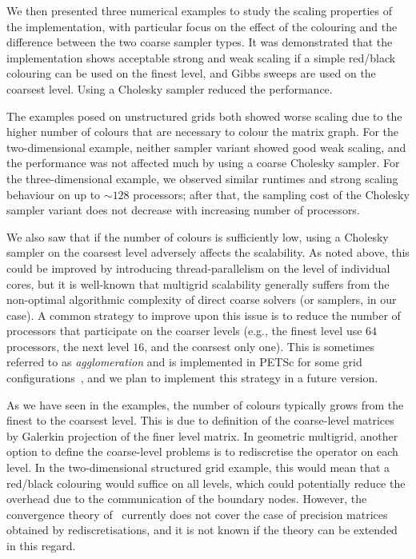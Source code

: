 \documentclass[
fontsize=11pt,
paper=a4,
numbers=noenddot
]{scrartcl}
\begin{document}
We then presented three numerical examples to study the scaling properties of the implementation, with particular focus on the effect of the colouring and the difference between the two coarse sampler types. It was demonstrated that the implementation shows acceptable strong and weak scaling if a simple red/black colouring can be used on the finest level, and Gibbs sweeps are used on the coarsest level. Using a Cholesky sampler reduced the performance.

The examples posed on unstructured grids both showed worse scaling due to the higher number of colours that are necessary to colour the matrix graph. For the two-dimensional example, neither sampler variant showed good weak scaling, and the performance was not affected much by using a coarse Cholesky sampler. For the three-dimensional example, we observed similar runtimes and strong scaling behaviour on up to $\sim 128$ processors; after that, the sampling cost of the Cholesky sampler variant does not decrease with increasing number of processors.

We also saw that if the number of colours is sufficiently low, using a Cholesky sampler on the coarsest level adversely affects the scalability. As noted above, this could be improved by introducing thread-parallelism on the level of individual cores, but it is well-known that multigrid scalability generally suffers from the non-optimal algorithmic complexity of direct coarse solvers (or samplers, in our case). A common strategy to improve upon this issue is to reduce the number of processors that participate on the coarser levels (e.g., the finest level use $64$ processors, the next level $16$, and the coarsest only one). This is sometimes referred to as \emph{agglomeration} and is implemented in PETSc for some grid configurations~\cite{petsc-multigrid}, and we plan to implement this strategy in a future version.

As we have seen in the examples, the number of colours typically grows from the finest to the coarsest level. This is due to definition of the coarse-level matrices by Galerkin projection of the finer level matrix. In geometric multigrid, another option to define the coarse-level problems is to rediscretise the operator on each level. In the two-dimensional structured grid example, this would mean that a red/black colouring would suffice on all levels, which could potentially reduce the overhead due to the communication of the boundary nodes. However, the convergence theory of~\cite{kazashimuellerscheichl} currently does not cover the case of precision matrices obtained by rediscretisations, and it is not known if the theory can be extended in this regard.
\end{document}
